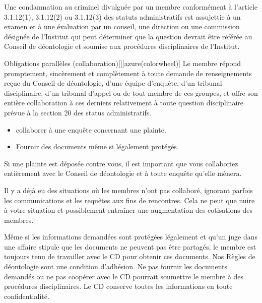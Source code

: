 \documentclass[10pt, french]{article}
\begin{document}
\begin{multicols*}{2}
\begin{definitionNOHFILLsub}[Annotation 11-2]
Une condamnation au criminel divulguée par un membre conformément à l’article 3.1.12(1), 3.1.12(2) ou 3.1.12(3) des statuts administratifs est assujettie à un examen et à une évaluation par un conseil, une direction ou une commission désignée de l’Institut qui peut déterminer que la question devrait être référée au Conseil de déontologie et soumise aux procédures disciplinaires de l’Institut.
\end{definitionNOHFILLsub}

\bigskip

\begin{definitionGENERAL}{Obligations parallèles (collaboration)}[][azure(colorwheel)]
Le membre répond promptement, sincèrement et complètement à toute demande de renseignements reçue du Conseil de déontologie, d'une équipe d'enquête, d'un tribunal disciplinaire, d'un tribunal d'appel ou de tout membre de ces groupes, et offre son entière collaboration à ces derniers relativement à toute question disciplinaire prévue à la section 20 des status administratifs.

\bigskip

\begin{rappel_enhanced}[Exemple]
\begin{itemize}
	\item	collaborer à une enquête concernant une plainte. 
	\item	Fournir des documents même si légalement protégés.
\end{itemize}
\end{rappel_enhanced}
\end{definitionGENERAL}

\begin{definitionNOHFILLsub}[Note]
Si une plainte est déposée contre vous, il est important que vous collaboriez entièrement avec le Conseil de déontologie et à toute enquête qu’elle mènera.  

\bigskip

Il y a déjà eu des situations où les membres n’ont pas collaboré, ignorant parfois les communications et les requêtes aux fins de rencontres. Cela ne peut que nuire à votre situation et possiblement entraîner une augmentation des cotisations des membres.  

\bigskip

Même si les informations demandées sont protégées légalement et qu’un juge dans une affaire stipule que les documents ne peuvent pas être partagés, le membre est toujours tenu de travailler avec le CD pour obtenir ces documents. Nos Règles de déontologie sont une condition d’adhésion. Ne pas fournir les documents demandés ou ne pas coopérer avec le CD pourrait soumettre le membre à des procédures disciplinaires. Le CD conserve toutes les informations en toute confidentialité.
\end{definitionNOHFILLsub}


\end{multicols*}
\end{document}
